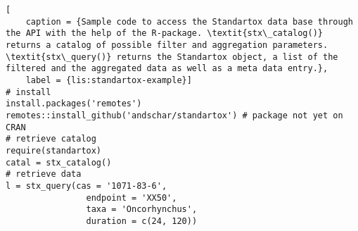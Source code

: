 \begin{lstlisting}[
    caption = {Sample code to access the Standartox data base through the API with the help of the R-package. \textit{stx\_catalog()} returns a catalog of possible filter and aggregation parameters. \textit{stx\_query()} returns the Standartox object, a list of the filtered and the aggregated data as well as a meta data entry.},
    label = {lis:standartox-example}]
# install
install.packages('remotes')
remotes::install_github('andschar/standartox') # package not yet on CRAN
# retrieve catalog    
require(standartox)
catal = stx_catalog()
# retrieve data
l = stx_query(cas = '1071-83-6',
                endpoint = 'XX50',
                taxa = 'Oncorhynchus',
                duration = c(24, 120))
\end{lstlisting}